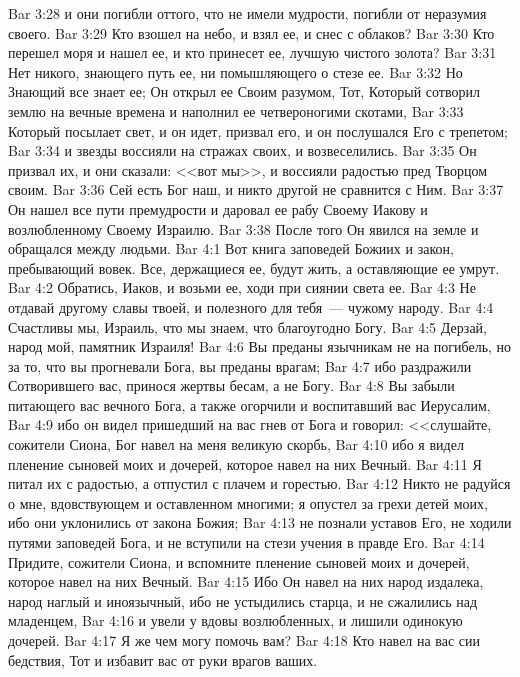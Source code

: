 \vs Bar 3:28 и они погибли оттого, что не имели мудрости, погибли от неразумия своего.
\vs Bar 3:29 Кто взошел на небо, и взял ее, и снес с облаков?
\vs Bar 3:30 Кто перешел моря и нашел ее, и кто принесет ее, лучшую чистого золота?
\vs Bar 3:31 Нет никого, знающего путь ее, ни помышляющего о стезе ее.
\vs Bar 3:32 Но Знающий все знает ее; Он открыл ее Своим разумом, Тот, Который сотворил землю на вечные времена и наполнил ее четвероногими скотами,
\vs Bar 3:33 Который посылает свет, и он идет, призвал его, и он послушался Его с трепетом;
\vs Bar 3:34 и звезды воссияли на стражах своих, и возвеселились.
\vs Bar 3:35 Он призвал их, и они сказали: <<вот мы>>, и воссияли радостью пред Творцом своим.
\vs Bar 3:36 Сей есть Бог наш, и никто другой не сравнится с Ним.
\vs Bar 3:37 Он нашел все пути премудрости и даровал ее рабу Своему Иакову и возлюбленному Своему Израилю.
\vs Bar 3:38 После того Он явился на земле и обращался между людьми.
\vs Bar 4:1 Вот книга заповедей Божиих и закон, пребывающий вовек. Все, держащиеся ее, будут жить, а оставляющие ее умрут.
\vs Bar 4:2 Обратись, Иаков, и возьми ее, ходи при сиянии света ее.
\vs Bar 4:3 Не отдавай другому славы твоей, и полезного для тебя~--- чужому народу.
\vs Bar 4:4 Счастливы мы, Израиль, что мы знаем, что благоугодно Богу.
\vs Bar 4:5 Дерзай, народ мой, памятник Израиля!
\vs Bar 4:6 Вы преданы язычникам не на погибель, но за то, что вы прогневали Бога, вы преданы врагам;
\vs Bar 4:7 ибо раздражили Сотворившего вас, принося жертвы бесам, а не Богу.
\vs Bar 4:8 Вы забыли питающего вас вечного Бога, а также огорчили и воспитавший вас Иерусалим,
\vs Bar 4:9 ибо он видел пришедший на вас гнев от Бога и говорил: <<слушайте, сожители Сиона, Бог навел на меня великую скорбь,
\vs Bar 4:10 ибо я видел пленение сыновей моих и дочерей, которое навел на них Вечный.
\vs Bar 4:11 Я питал их с радостью, а отпустил с плачем и горестью.
\vs Bar 4:12 Никто не радуйся о мне, вдовствующем и оставленном многими; я опустел за грехи детей моих, ибо они уклонились от закона Божия;
\vs Bar 4:13 не познали уставов Его, не ходили путями заповедей Бога, и не вступили на стези учения в правде Его.
\vs Bar 4:14 Придите, сожители Сиона, и вспомните пленение сыновей моих и дочерей, которое навел на них Вечный.
\vs Bar 4:15 Ибо Он навел на них народ издалека, народ наглый и иноязычный, ибо не устыдились старца, и не сжалились над младенцем,
\vs Bar 4:16 и увели у вдовы  возлюбленных, и лишили одинокую дочерей.
\vs Bar 4:17 Я же чем могу помочь вам?
\vs Bar 4:18 Кто навел на вас сии бедствия, Тот и избавит вас от руки врагов ваших.
